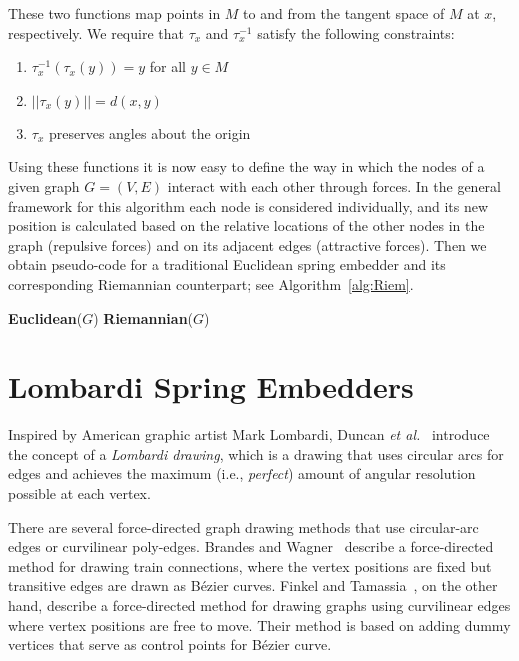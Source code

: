 \documentclass[notitlepage,letter,11pt]{article}
\begin{document}
These two functions map points in $M$ to and
from the tangent space of $M$ at $x$, respectively. We require that
$\tau_x$ and $\tau_x^{-1}$ satisfy the following constraints:



\begin{enumerate}
    \item $\tau_x^{-1}(\tau_x(y)) = y$ for all $y \in M$
    \item $|| \tau_x(y) || = d(x,y)$
    \item $\tau_x$ preserves angles about the origin
\end{enumerate}

Using these functions it is now easy to define the way in which the
nodes of a given graph $G=(V,E)$ interact with each other through
forces.  In the general framework for this algorithm each node is
considered individually, and its new position is calculated based on
the relative locations of the other nodes in the graph (repulsive
forces) and on its adjacent edges (attractive forces). Then we obtain
pseudo-code for a traditional Euclidean spring embedder and its
corresponding Riemannian counterpart; see Algorithm~\ref{alg:Riem}.

\begin{algorithm}
{\bf Euclidean}($G$) 
 {\bf Riemannian}($G$) 
\caption{Euclidean and Riemannian\label{alg:Riem}}
\end{algorithm}

\section{Lombardi Spring Embedders}
\label{fd:sec:lom}

Inspired by American graphic artist Mark Lombardi, Duncan {\it et al.}~\cite{degkn-dtwpa-10,degkn-ldg-10}
introduce the concept of a \emph{Lombardi drawing}, which is a
drawing that uses circular arcs for edges and achieves the maximum
(i.e., \emph{perfect}) amount of angular resolution possible at each
vertex. 

There are several force-directed graph drawing methods
that use circular-arc edges or curvilinear poly-edges.
Brandes and Wagner~\cite{DBLP:journals/jgaa/BrandesW00}
describe a force-directed method for drawing train connections, where the vertex positions are fixed
but transitive edges are drawn as B{\'e}zier curves.
Finkel and Tamassia~\cite{ft-cgduf-05}, on the other hand,
describe a force-directed
method for drawing graphs using curvilinear edges where vertex
positions are free to move. Their method is
based on adding dummy vertices that serve as control points for B{\'e}zier curve.
\end{document}
